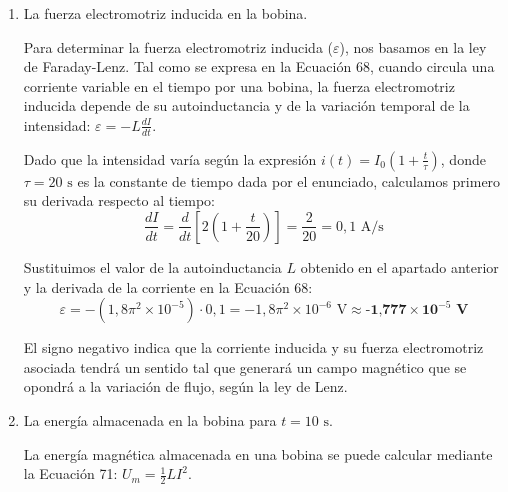 \documentclass[11pt, a4paper]{article}
\newenvironment{problem}[1][Cuestión]{
	\vspace{0.5cm}
	\noindent{\Large\bfseries #1} \par\vspace{0.5cm}
}{
	\vspace{0.5cm}
}
\begin{document}
\begin{problem}[Problema]
\begin{enumerate}[label=\alph*)]
{					Por último, sustituimos todos los valores en la Ecuación 67 para obtener la autoinductancia:
					\begin{align*}
						L &= (4\pi \times 10^{-7}) \cdot (1500)^2 \cdot (\pi \times 10^{-4}) \cdot 0,2 \\
						&= (4\pi \times 10^{-7}) \cdot (2,25 \times 10^6) \cdot (\pi \times 10^{-4}) \cdot 0,2 \\
						&= 1,8 \pi^2 \times 10^{-5} \text{ H} \approx \textbf{1,777} \times \textbf{10}^{-4} \textbf{ H}
					\end{align*}
				}

			\item La fuerza electromotriz inducida en la bobina.

				{ \color{blue} 
					Para determinar la fuerza electromotriz inducida ($\varepsilon$), nos basamos en la ley de Faraday-Lenz. Tal como se expresa en la Ecuación 68, cuando circula una corriente variable en el tiempo por una bobina, la fuerza electromotriz inducida depende de su autoinductancia y de la variación temporal de la intensidad: $\varepsilon = -L \frac{dI}{dt}$.

					Dado que la intensidad varía según la expresión $i(t) = I_0 \left( 1 + \frac{t}{\tau} \right)$, donde $\tau = 20 \text{ s}$ es la constante de tiempo dada por el enunciado, calculamos primero su derivada respecto al tiempo:
					\begin{equation*}
						\frac{dI}{dt} = \frac{d}{dt} \left[ 2 \left( 1 + \frac{t}{20} \right) \right] = \frac{2}{20} = 0,1 \text{ A/s}
					\end{equation*}

					Sustituimos el valor de la autoinductancia $L$ obtenido en el apartado anterior y la derivada de la corriente en la Ecuación 68:
					\begin{equation*}
						\boxed{\varepsilon = - (1,8 \pi^2 \times 10^{-5}) \cdot 0,1 = -1,8 \pi^2 \times 10^{-6} \text{ V} \approx \textbf{-1,777} \times \textbf{10}^{-5} \textbf{ V}}
					\end{equation*}

					El signo negativo indica que la corriente inducida y su fuerza electromotriz asociada tendrá un sentido tal que generará un campo magnético que se opondrá a la variación de flujo, según la ley de Lenz.
				}

			\item La energía almacenada en la bobina para $t = 10 \text{ s}$.

				{ \color{blue} 
					La energía magnética almacenada en una bobina se puede calcular mediante la Ecuación 71: $U_m = \frac{1}{2} L I^2$.

}
\end{enumerate}
\end{problem}
\end{document}
